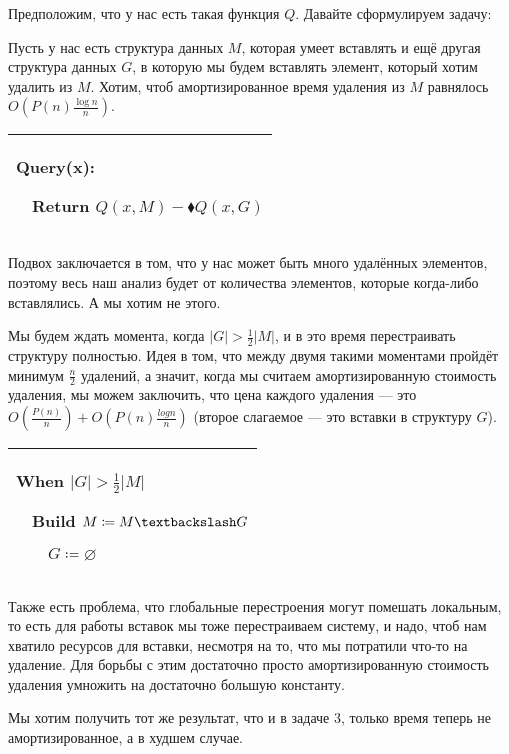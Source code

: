 Предположим, что у нас есть такая функция $Q$. Давайте сформулируем задачу:

\begin{task}
Пусть у нас есть структура данных $M$, которая умеет вставлять и ещё другая структура данных $G$, в которую мы будем вставлять элемент, который хотим удалить из $M$. Хотим, чтоб амортизированное время удаления из $M$ равнялось $O\left(P(n)\frac{\log n}{n}\right)$.

\end{task}

\begin{tabular}{|p{5cm}|}
\hline
Query(x):

$\quad$Return $Q(x,M)-\blacklozenge Q(x,G)$\\
\hline
\end{tabular}


Подвох заключается в том, что у нас может быть много удалённых элементов, поэтому весь наш анализ будет от количества элементов, которые когда-либо вставлялись. А мы хотим не этого.

Мы будем ждать момента, когда $|G|>\frac{1}{2}|M|$, и в это время перестраивать структуру полностью. Идея в том, что между двумя такими моментами пройдёт минимум $\frac{n}{2}$ удалений, а значит, когда мы считаем амортизированную стоимость удаления, мы можем заключить, что цена каждого удаления — это
$O\left(\frac{P(n)}{n}\right)+O\left(P(n)\frac{log n}{n}\right)$ (второе слагаемое — это вставки в структуру $G$).

\begin{tabular}{|p{5cm}|}
\hline

When $|G|>\frac{1}{2}|M|$

$\quad$Build $M \coloneqq M\textbackslash G$

$\quad$$\quad$$G \coloneqq \varnothing$\\

\hline
\end{tabular}

Также есть проблема, что глобальные перестроения могут помешать локальным, то есть для работы вставок мы тоже перестраиваем систему, и надо, чтоб нам хватило ресурсов для вставки, несмотря на то, что мы потратили что-то на удаление. Для борьбы с этим достаточно просто амортизированную стоимость удаления умножить на достаточно большую константу.


\begin{task}
Мы хотим получить тот же результат, что и в задаче 3, только время теперь не амортизированное, а в худшем случае.
\end{task}

